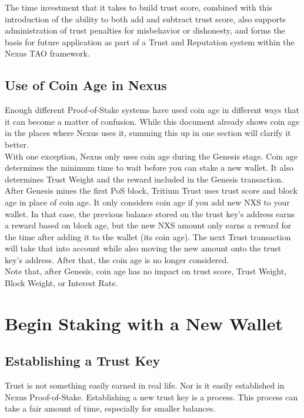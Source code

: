 \documentclass[11pt]{article}
\begin{document}
\noindent The time investment that it takes to build trust score, combined with this introduction of the ability to both add and subtract trust score, also supports administration of trust penalties for misbehavior or dishonesty, and forms the basis for future application as part of a Trust and Reputation system within the Nexus TAO framework.\\

\subsection{Use of Coin Age in Nexus}
Enough different Proof-of-Stake systems have used coin age in different ways that it can become a matter of confusion. While this document already shows coin age in the places where Nexus uses it, summing this up in one section will clarify it better.\\

\noindent With one exception, Nexus only uses coin age during the Genesis stage. Coin age determines the minimum time to wait before you can stake a new wallet. It also determines Trust Weight and the reward included in the Genesis transaction.\\

\noindent After Genesis mines the first PoS block, Tritium Trust uses trust score and block age in place of coin age. It only considers coin age if you add new NXS to your wallet. In that case, the previous balance stored on the trust key's address earns a reward based on block age, but the new NXS amount only earns a reward for the time after adding it to the wallet (its coin age). The next Trust transaction will take that into account while also moving the new amount onto the trust key's address. After that, the coin age is no longer considered. \\

\noindent Note that, after Genesis, coin age has no impact on trust score, Trust Weight, Block Weight, or Interest Rate.\\

\bigskip

\section{Begin Staking with a New Wallet}

\subsection{Establishing a Trust Key}
Trust is not something easily earned in real life. Nor is it easily established in Nexus Proof-of-Stake. Establishing a new trust key is a process. This process can take a fair amount of time, especially for smaller balances.\\
\end{document}
